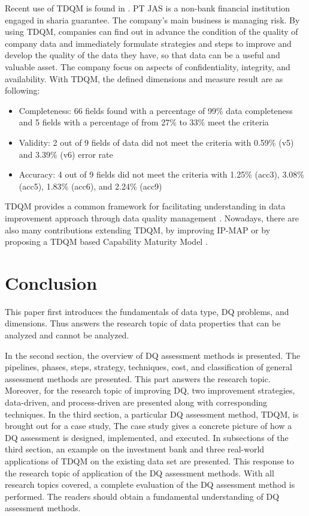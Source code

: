 \documentclass[pdftex,english,oribibl]{llncs}
\begin{document}
Recent use of TDQM is found in \citet{Bowo2019CaseStudy}. PT JAS is a non-bank financial institution engaged in sharia guarantee. The company's main business is managing risk. By using TDQM, companies can find out in advance the condition of the quality of company data and immediately formulate strategies and steps to improve and develop the quality of the data they have, so that data can be a useful and valuable asset. The company focus on aspects of confidentiality, integrity, and availability. With TDQM, the defined dimensions and measure result are as following:
\begin{itemize}
    \item Completeness: 66 fields found with a percentage of 99\% data completeness and 5 fields with a percentage of from 27\% to 33\% meet the criteria
    \item Validity: 2 out of 9 fields of data did not meet the criteria with 0.59\% (v5) and 3.39\% (v6) error rate
    \item Accuracy: 4 out of 9 fields did not meet the criteria with  1.25\% (acc3), 3.08\% (acc5), 1.83\% (acc6), and 2.24\% (acc9)

\end{itemize}
TDQM provides a common framework for facilitating understanding in data improvement approach through data quality management .
Nowadays, there are also many contributions extending TDQM, by improving IP-MAP \cite{Scannapieco2002, Shankaranarayanan2007IPMAPC} or by proposing a TDQM based Capability Maturity Model \citep{Baskarada2006}.

\section{Conclusion}
This paper first introduces the fundamentals of data type, DQ problems, and dimensions.  Thus answers the research topic of data properties that can be analyzed and cannot be analyzed.

In the second section, the overview of DQ assessment methods is presented. The pipelines, phases, steps, strategy, techniques, cost, and classification of general assessment methods are presented. This part answers the research topic. Moreover, for the research topic of improving DQ, two improvement strategies, data-driven, and process-driven are presented along with corresponding techniques.
In the third section, a particular DQ assessment method, TDQM, is brought out for a case study, The case study gives a concrete picture of how a DQ assessment is designed, implemented, and executed. In subsections of the third section, an example on the investment bank and three real-world applications of TDQM on the existing data set are presented. This response to the research topic of application of the DQ assessment methods. With all research topics covered, a complete evaluation of the DQ assessment method is performed. The readers should obtain a fundamental understanding of DQ assessment methods.
\end{document}
